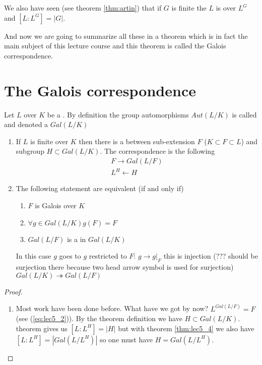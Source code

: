 We also have seen (see theorem \ref{thm:artin}) that if $G$ is finite
the $L$ is  over $L^G$ and
$\left[L:L^G\right] = \left|G\right|$.

And now we are going to summarize all these in a theorem which is in
fact the main subject of this lecture course and this theorem is
called the Galois correspondence. 

\section{The Galois correspondence}

Let $L$ over $K$ be a . By definition the
group automorphisms $Aut\left(L/K\right)$ is called
 and denoted a $Gal\left(L/K\right)$
\begin{theorem}
  \begin{enumerate}
  \item If $L$ is finite over $K$ then there is a
     between sub-extension $F$
    ($K \subset F \subset L$) and subgroup $H \subset
    Gal\left(L/K\right)$. The correspondence is the following
    \begin{eqnarray}
      F \rightarrow Gal\left(L/F\right)
      \nonumber \\
      L^H \leftarrow H
      \nonumber
    \end{eqnarray}
  \item The following statement are equivalent (if and only if)
    \begin{enumerate}
    \item $F$ is Galois over $K$
    \item $\forall g \in Gal\left(L/K\right) g\left(F\right) = F$
    \item $Gal\left(L/F\right)$ is a  in
      $Gal\left(L/K\right)$ 
    \end{enumerate}
    In this case  $g$ goes to $g$ restricted to $F$: $g \to
    \left.g\right|_F$ this is injection (??? should be surjection
    there because two head arrow symbol is used for surjection)
    $Gal\left(L/K\right) \twoheadrightarrow Gal\left(L/F\right)$
  \end{enumerate}
  \begin{proof}
    \begin{enumerate}
    \item Most work have been done before. What have we got by now?
      $L^{Gal\left(L/F\right)} = F$ (see (\ref{eq:lec5_2})). By
      the theorem definition we have $H \subset Gal\left(L/K\right)$.
       theorem gives us
      $\left[L:L^H\right] = \left|H\right|$ but with theorem
      \ref{thm:lec5_4} we also have
      $\left[L:L^H\right] = \left|Gal\left(L/L^H\right)\right|$ so one
      must have $H = Gal\left(L/L^H\right)$.


\end{enumerate}
\end{proof}
\end{theorem}
